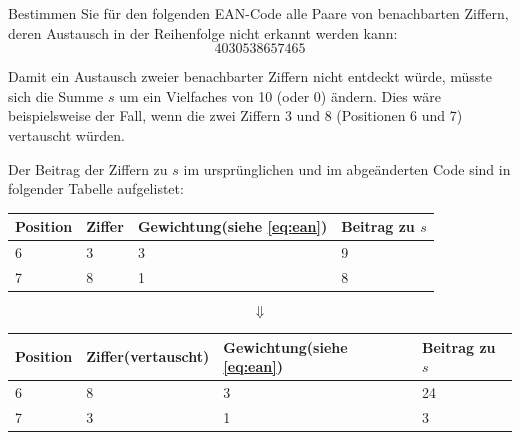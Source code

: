 \begin{myexercise}\label{ex:ean}
	Bestimmen Sie für den folgenden \gls{EAN}-Code alle Paare von benachbarten Ziffern, deren Austausch in der Reihenfolge nicht erkannt werden kann:
	\[4030538657465\]
	\begin{myanswer}
		Damit ein Austausch zweier benachbarter Ziffern nicht entdeckt würde, müsste sich die Summe \(s\) um ein Vielfaches von 10 (oder 0) ändern. Dies wäre beispielsweise der Fall, wenn die zwei Ziffern 3 und 8 (Positionen 6 und 7) vertauscht würden.

		Der Beitrag der Ziffern zu \(s\) im ursprünglichen und im abgeänderten Code sind in folgender Tabelle aufgelistet:


		\begin{table}[H]
			\centering
			\begin{tabular}{l|p{3cm}|p{4cm}|l}
				\textbf{Position} & \textbf{Ziffer} & \textbf{Gewichtung\newline (siehe \cref{eq:ean})} & \textbf{Beitrag zu \(s\)} \\
				\midrule
				6                 & 3               & 3                                                 & 9                         \\
				7                 & 8               & 1                                                 & 8                         \\
			\end{tabular}
		\end{table}
		\[\Downarrow\]
		\begin{table}[H]
			\centering
			\begin{tabular}{l|p{3cm}|p{4cm}|l}
				\textbf{Position} & \textbf{Ziffer\newline (vertauscht)} & \textbf{Gewichtung\newline (siehe \cref{eq:ean})} & \textbf{Beitrag zu \(s\)} \\
				\midrule
				6                 & 8                                    & 3                                                 & 24                        \\
				7                 & 3                                    & 1                                                 & 3                         \\
			\end{tabular}
		\end{table}


\end{myanswer}
\end{myexercise}
